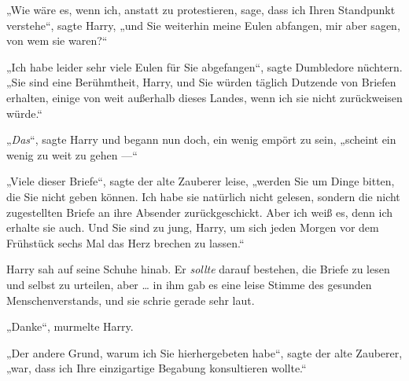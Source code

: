 „Wie wäre es, wenn ich, anstatt zu protestieren, sage, dass ich Ihren Standpunkt verstehe“, sagte Harry, „und Sie weiterhin meine Eulen abfangen, mir aber sagen, von wem sie waren?“

„Ich habe leider sehr viele Eulen für Sie abgefangen“, sagte Dumbledore nüchtern.
„Sie sind eine Berühmtheit, Harry, und Sie würden täglich Dutzende von Briefen erhalten, einige von weit außerhalb dieses Landes, wenn ich sie nicht zurückweisen würde.“

„\emph{Das}“, sagte Harry und begann nun doch, ein wenig empört zu sein, „scheint ein wenig zu weit zu gehen —“

„Viele dieser Briefe“, sagte der alte Zauberer leise, „werden Sie um Dinge bitten, die Sie nicht geben können. Ich habe sie natürlich nicht gelesen, sondern die nicht zugestellten Briefe an ihre Absender zurückgeschickt. Aber ich weiß es, denn ich erhalte sie auch. Und Sie sind zu jung, Harry, um sich jeden Morgen vor dem Frühstück sechs Mal das Herz brechen zu lassen.“

Harry sah auf seine Schuhe hinab. Er \emph{sollte} darauf bestehen, die Briefe zu lesen und selbst zu urteilen, aber … in ihm gab es eine leise Stimme des gesunden Menschenverstands, und sie schrie gerade sehr laut.

„Danke“, murmelte Harry.

„Der andere Grund, warum ich Sie hierhergebeten habe“, sagte der alte Zauberer, „war, dass ich Ihre einzigartige Begabung konsultieren wollte.“

